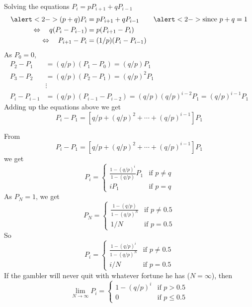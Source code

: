\documentclass[letterpaper,handout, mathserif]{beamer}
\begin{document}
\begin{frame}{Solving the equations $P_i=pP_{i+1}+qP_{i-1}$}
\begin{align*}
\alert<2->{(p+q)}P_i&=pP_{i+1}+qP_{i-1}&\alert<2->{\text{since }p+q=1}\\
\Leftrightarrow\quad q(P_i- P_{i-1})&=p(P_{i+1}- P_i)\\
\Leftrightarrow\quad P_{i+1}- P_i&=(1/p)(P_i- P_{i-1})
\end{align*}
As $P_0=0$,
\begin{align*}
P_2- P_1&=(q/p)(P_1- P_0)=(q/p)P_1\\
P_3- P_2&=(q/p)(P_2- P_1)=(q/p)^2P_1\\[-3pt]
&\vdots\\[-3pt]
P_i- P_{i-1}
&=(q/p)(P_{i-1}-P_{i-2})=(q/p)(q/p)^{i-2}P_1=(q/p)^{i-1}P_1
\end{align*}
Adding up the equations above we get
\[P_i-P_1=\left[q/p+(q/p)^2+\cdots+(q/p)^{i-1}\right]P_1\]
\end{frame}
\begin{frame}
From
\[P_i-P_1=\left[q/p+(q/p)^2+\cdots+(q/p)^{i-1}\right]P_1\]
we get
\[
P_i=
\begin{cases}
\frac{1-(q/p)^i}{1-(q/p)}P_1 &\text{if }p\neq q\\
i P_1 &\text{if }p=q
\end{cases}
\]
As $P_N=1$, we get
\[
P_N=
\begin{cases}
\frac{1-(q/p)}{1-(q/p)^N} &\text{if }p\neq 0.5\\
1/N &\text{if }p=0.5
\end{cases}
\]
So
\[
P_i=
\begin{cases}
\frac{1-(q/p)^i}{1-(q/p)^N} &\text{if }p\neq 0.5\\
i/N &\text{if }p=0.5
\end{cases}
\]
If the gambler will never quit with whatever fortune he has ($N=\infty$),
then
\[
\lim_{N\to\infty}P_i=
\begin{cases}
1-(q/p)^i &\text{if }p>0.5\\
0 &\text{if }p\le 0.5
\end{cases}
\]
\end{frame}
\end{document}
